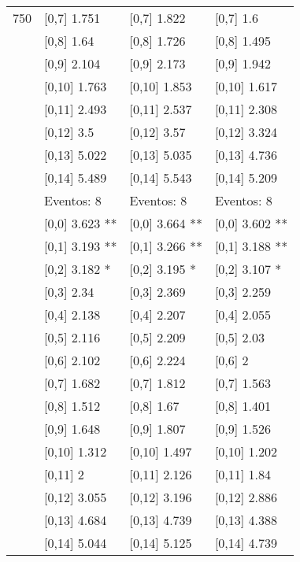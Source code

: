 \begin{table}
\begin{tabular}[t]{llll}
750 & {}[0,7] 1.751 & {}[0,7] 1.822 & {}[0,7] 1.6\\
\addlinespace
 & {}[0,8] 1.64 & {}[0,8] 1.726 & {}[0,8] 1.495\\
 & {}[0,9] 2.104 & {}[0,9] 2.173 & {}[0,9] 1.942\\
 & {}[0,10] 1.763 & {}[0,10] 1.853 & {}[0,10] 1.617\\
 & {}[0,11] 2.493 & {}[0,11] 2.537 & {}[0,11] 2.308\\
 & {}[0,12] 3.5 & {}[0,12] 3.57 & {}[0,12] 3.324\\
\addlinespace
 & {}[0,13] 5.022 & {}[0,13] 5.035 & {}[0,13] 4.736\\
 & {}[0,14] 5.489 & {}[0,14] 5.543 & {}[0,14] 5.209\\
 & Eventos:  8 & Eventos:  8 & Eventos:  8\\
 & {}[0,0] 3.623 ** & {}[0,0] 3.664 ** & {}[0,0] 3.602 **\\
 & {}[0,1] 3.193 ** & {}[0,1] 3.266 ** & {}[0,1] 3.188 **\\
\addlinespace
 & {}[0,2] 3.182 * & {}[0,2] 3.195 * & {}[0,2] 3.107 *\\
 & {}[0,3] 2.34 & {}[0,3] 2.369 & {}[0,3] 2.259\\
 & {}[0,4] 2.138 & {}[0,4] 2.207 & {}[0,4] 2.055\\
 & {}[0,5] 2.116 & {}[0,5] 2.209 & {}[0,5] 2.03\\
 & {}[0,6] 2.102 & {}[0,6] 2.224 & {}[0,6] 2\\
\addlinespace
1000 & {}[0,7] 1.682 & {}[0,7] 1.812 & {}[0,7] 1.563\\
 & {}[0,8] 1.512 & {}[0,8] 1.67 & {}[0,8] 1.401\\
 & {}[0,9] 1.648 & {}[0,9] 1.807 & {}[0,9] 1.526\\
 & {}[0,10] 1.312 & {}[0,10] 1.497 & {}[0,10] 1.202\\
 & {}[0,11] 2 & {}[0,11] 2.126 & {}[0,11] 1.84\\
\addlinespace
 & {}[0,12] 3.055 & {}[0,12] 3.196 & {}[0,12] 2.886\\
 & {}[0,13] 4.684 & {}[0,13] 4.739 & {}[0,13] 4.388\\
 & {}[0,14] 5.044 & {}[0,14] 5.125 & {}[0,14] 4.739\\
\bottomrule
\end{tabular}
\end{table}
